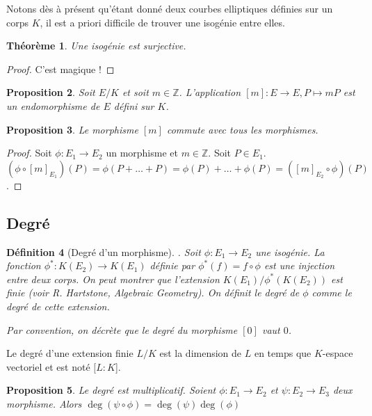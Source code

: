 \documentclass{article}
\theoremstyle{plain}%
\newtheorem{thm}{Théorème}[section]
\newtheorem{prop}[thm]{Proposition}
\newtheorem{deff}[thm]{Définition}
\theoremstyle{definition}%
\newcommand{\Z}{\mathbb{Z}}
\begin{document}
Notons dès à présent qu'étant donné deux courbes elliptiques définies sur un corps $K$, il est a priori difficile de trouver une isogénie entre elles.

\begin{thm}
  Une isogénie est surjective.  
\end{thm}

\begin{proof}
  C'est magique !
\end{proof}

\begin{prop}
  Soit $E/K$ et soit $m\in\Z$. L'application $[m] : E \to E, P \mapsto mP$ est un endomorphisme de $E$ défini sur $K$. 
\end{prop}




\begin{prop}
  Le morphisme $[m]$ commute avec tous les morphismes. 
\end{prop}

\begin{proof}
  Soit $\phi : E_1\to E_2$ un morphisme et $m\in\Z$. Soit $P\in E_1$. $(\phi \circ [m]_{E_1})(P) = \phi(P + \ldots + P) = \phi(P) + \ldots + \phi(P) = ([m]_{E_2} \circ \phi)(P)$.
\end{proof}

\subsection{Degré}

\begin{deff}[Degré d'un morphisme]. 
  Soit $\phi : E_1 \to E_2$ une isogénie. La fonction $\phi^* : K(E_2) \to K(E_1)$ définie par $\phi^*(f) = f \circ \phi$ est une injection entre deux corps. On peut montrer que l'extension $K(E_1)/\phi^*(K(E_2))$ est finie (voir R. Hartstone, Algebraic Geometry). On définit le degré de $\phi$ comme le degré de cette extension.
  
  Par convention, on décrète que le degré du morphisme $[0]$ vaut $0$.
\end{deff}

Le degré d'une extension finie $L/K$ est la dimension de $L$ en temps que $K$-espace vectoriel et est noté $[L : K$].

\begin{prop}
  Le degré est multiplicatif. Soient $\phi : E_1\to E_2$ et $\psi : E_2\to E_3$ deux morphisme. Alors $\deg(\psi \circ \phi) = \deg(\psi)\deg(\phi)$ 
\end{prop}
\end{document}
